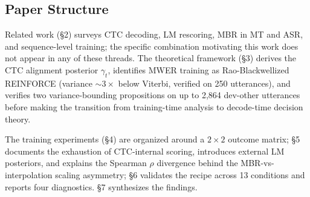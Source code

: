 \subsection{Paper Structure}

Related work (§2) surveys CTC decoding, LM rescoring, MBR in MT and ASR, and sequence-level training; the specific combination motivating this work does not appear in any of these threads. The theoretical framework (§3) derives the CTC alignment posterior $\gamma_t$, identifies MWER training as Rao-Blackwellized REINFORCE (variance ${\sim}3\times$ below Viterbi, verified on 250 utterances), and verifies two variance-bounding propositions on up to 2{,}864 dev-other utterances before making the transition from training-time analysis to decode-time decision theory.

The training experiments (§4) are organized around a $2\times2$ outcome matrix; §5 documents the exhaustion of CTC-internal scoring, introduces external LM posteriors, and explains the Spearman $\rho$ divergence behind the MBR-vs-interpolation scaling asymmetry; §6 validates the recipe across 13 conditions and reports four diagnostics. §7 synthesizes the findings.




